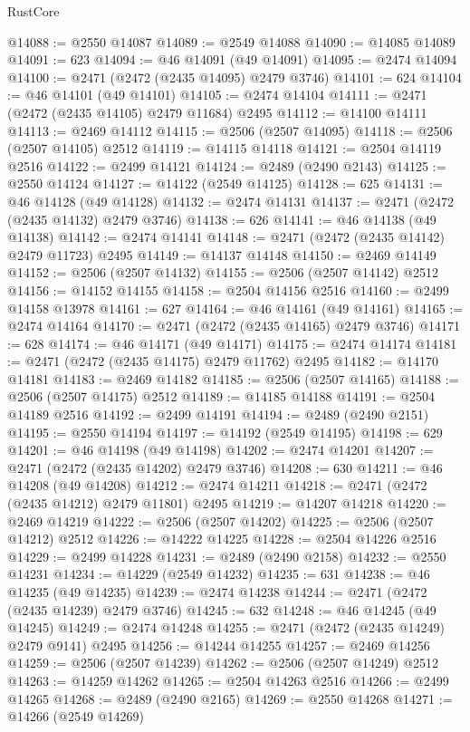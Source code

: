 \begin{lexlean}{RustCore}
\begin{coremodule}
@14088 := @2550 @14087
@14089 := @2549 @14088
@14090 := @14085 @14089
@14091 := 623
@14094 := @46 @14091 (@49 @14091)
@14095 := @2474 @14094
@14100 := @2471 (@2472 (@2435 @14095) @2479 @3746)
@14101 := 624
@14104 := @46 @14101 (@49 @14101)
@14105 := @2474 @14104
@14111 := @2471 (@2472 (@2435 @14105) @2479 @11684) @2495
@14112 := @14100 @14111
@14113 := @2469 @14112
@14115 := @2506 (@2507 @14095)
@14118 := @2506 (@2507 @14105) @2512
@14119 := @14115 @14118
@14121 := @2504 @14119 @2516
@14122 := @2499 @14121
@14124 := @2489 (@2490 @2143)
@14125 := @2550 @14124
@14127 := @14122 (@2549 @14125)
@14128 := 625
@14131 := @46 @14128 (@49 @14128)
@14132 := @2474 @14131
@14137 := @2471 (@2472 (@2435 @14132) @2479 @3746)
@14138 := 626
@14141 := @46 @14138 (@49 @14138)
@14142 := @2474 @14141
@14148 := @2471 (@2472 (@2435 @14142) @2479 @11723) @2495
@14149 := @14137 @14148
@14150 := @2469 @14149
@14152 := @2506 (@2507 @14132)
@14155 := @2506 (@2507 @14142) @2512
@14156 := @14152 @14155
@14158 := @2504 @14156 @2516
@14160 := @2499 @14158 @13978
@14161 := 627
@14164 := @46 @14161 (@49 @14161)
@14165 := @2474 @14164
@14170 := @2471 (@2472 (@2435 @14165) @2479 @3746)
@14171 := 628
@14174 := @46 @14171 (@49 @14171)
@14175 := @2474 @14174
@14181 := @2471 (@2472 (@2435 @14175) @2479 @11762) @2495
@14182 := @14170 @14181
@14183 := @2469 @14182
@14185 := @2506 (@2507 @14165)
@14188 := @2506 (@2507 @14175) @2512
@14189 := @14185 @14188
@14191 := @2504 @14189 @2516
@14192 := @2499 @14191
@14194 := @2489 (@2490 @2151)
@14195 := @2550 @14194
@14197 := @14192 (@2549 @14195)
@14198 := 629
@14201 := @46 @14198 (@49 @14198)
@14202 := @2474 @14201
@14207 := @2471 (@2472 (@2435 @14202) @2479 @3746)
@14208 := 630
@14211 := @46 @14208 (@49 @14208)
@14212 := @2474 @14211
@14218 := @2471 (@2472 (@2435 @14212) @2479 @11801) @2495
@14219 := @14207 @14218
@14220 := @2469 @14219
@14222 := @2506 (@2507 @14202)
@14225 := @2506 (@2507 @14212) @2512
@14226 := @14222 @14225
@14228 := @2504 @14226 @2516
@14229 := @2499 @14228
@14231 := @2489 (@2490 @2158)
@14232 := @2550 @14231
@14234 := @14229 (@2549 @14232)
@14235 := 631
@14238 := @46 @14235 (@49 @14235)
@14239 := @2474 @14238
@14244 := @2471 (@2472 (@2435 @14239) @2479 @3746)
@14245 := 632
@14248 := @46 @14245 (@49 @14245)
@14249 := @2474 @14248
@14255 := @2471 (@2472 (@2435 @14249) @2479 @9141) @2495
@14256 := @14244 @14255
@14257 := @2469 @14256
@14259 := @2506 (@2507 @14239)
@14262 := @2506 (@2507 @14249) @2512
@14263 := @14259 @14262
@14265 := @2504 @14263 @2516
@14266 := @2499 @14265
@14268 := @2489 (@2490 @2165)
@14269 := @2550 @14268
@14271 := @14266 (@2549 @14269)

\end{coremodule}
\end{lexlean}

